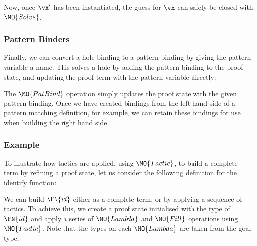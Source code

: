 \noindent
Now, once $\vx'$ has been instantiated, the guess for $\vx$ can safely be
closed with $\MO{Solve}$.

\subsubsection{Pattern Binders}

Finally, we can convert a hole binding to a pattern binding by giving the 
pattern variable a name. This solves a hole
by adding the pattern binding to the proof state, and updating the proof term
with the pattern variable directly:


The $\MO{PatBind}$ operation simply updates the proof state with the given pattern
binding. Once we have created bindings from the left hand side of a pattern
matching definition, for example, we can retain these bindings for use when
building the right hand side.

\subsubsection{Example}

To illustrate how tactics are applied, using $\MO{Tactic}$, to build a
complete term by refining a proof state, let us consider the following
\TT{} definition for the identify function:


We can build $\FN{id}$ either as a complete term, or by applying a sequence of
tactics.  To achieve this, we create a proof state initialised with the type of
$\FN{id}$ and apply a series of $\MO{Lambda}$ and $\MO{Fill}$ operations using
$\MO{Tactic}$.  Note that the types on each $\MO{Lambda}$ are taken from
the goal type.


